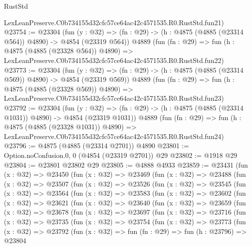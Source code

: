 \begin{lexlean}{RustStd}
\begin{coremodule}
    LexLeanPreserve.C0b734155d32cfc57ce64ac42c4571535.R0.RustStd.fun21)
@23754 := @23304
    (fun (y : @32) => (fn : @29) -> (h : @4875 (@4885 (@23314 @564)) @4890) -> @4854 (@23319 @564))
    @4889
    (fun (fn : @29) =>
    fun (h : @4875 (@4885 (@23328 @564)) @4890) =>
    LexLeanPreserve.C0b734155d32cfc57ce64ac42c4571535.R0.RustStd.fun22)
@23773 := @23304
    (fun (y : @32) => (fn : @29) -> (h : @4875 (@4885 (@23314 @569)) @4890) -> @4854 (@23319 @569))
    @4889
    (fun (fn : @29) =>
    fun (h : @4875 (@4885 (@23328 @569)) @4890) =>
    LexLeanPreserve.C0b734155d32cfc57ce64ac42c4571535.R0.RustStd.fun23)
@23792 := @23304
    (fun (y : @32) =>
    (fn : @29) -> (h : @4875 (@4885 (@23314 @1031)) @4890) -> @4854 (@23319 @1031))
    @4889
    (fun (fn : @29) =>
    fun (h : @4875 (@4885 (@23328 @1031)) @4890) =>
    LexLeanPreserve.C0b734155d32cfc57ce64ac42c4571535.R0.RustStd.fun24)
@23796 := @4875 (@4885 (@23314 @2701)) @4890
@23801 := Option.noConfusion.{0, 0} (@4854 (@23319 @2701)) @29
@23802 := @1918 @29
@23804 := @23801 @23802 @29
@23805 := @4888 @4933
@23859 := @23431
    (fun (x : @32) =>
    @23450
      (fun (x : @32) =>
      @23469
        (fun (x : @32) =>
        @23488
          (fun (x : @32) =>
          @23507
            (fun (x : @32) =>
            @23526
              (fun (x : @32) =>
              @23545
                (fun (x : @32) =>
                @23564
                  (fun (x : @32) =>
                  @23583
                    (fun (x : @32) =>
                    @23602
                      (fun (x : @32) =>
                      @23621
                        (fun (x : @32) =>
                        @23640
                          (fun (x : @32) =>
                          @23659
                            (fun (x : @32) =>
                            @23678
                              (fun (x : @32) =>
                              @23697
                                (fun (x : @32) =>
                                @23716
                                  (fun (x : @32) =>
                                  @23735
                                    (fun (x : @32) =>
                                    @23754
                                      (fun (x : @32) =>
                                      @23773
                                        (fun (x : @32) =>
                                        @23792
                                          (fun (x : @32) =>
                                          fun (fn : @29) =>
                                          fun (h : @23796) =>
                                          @23804

\end{coremodule}
\end{lexlean}
